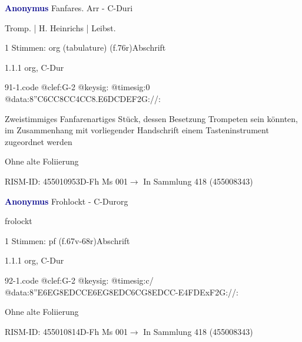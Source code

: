 \documentclass[twocolumn, 12pt]{book}
\begin{document}
\par \vspace{16pt} \textcolor{darkblue}{\textbf{Anonymus  }}\hfillplus{\textbf{[91]}}\newline Fanfares. Arr - C-Dur\newline i
\par \begin{itshape}[f.76r, at left:] Tromp. | H. Heinrichs | Leibst.\end{itshape} 
\par \textcolor{darkblue}{}  1 Stimmen: org (tabulature)  (f.76r)\newline Abschrift
\par 1.1.1  org, C-Dur  
\begin{filecontents*}{91-1.code}
@clef:G-2
@keysig:
@timesig:0
@data:{8''C6CC8CC}4CC{8.E6D}{CDEF}2G://:
\end{filecontents*}
\newline %
\par Zweistimmiges Fanfarenartiges Stück, dessen Besetzung Trompeten sein könnten, im Zusammenhang mit vorliegender Handschrift einem Tasteninstrument zugeordnet werden
\par Ohne alte Foliierung
\par RISM-ID: 455010953\newline D-Fh  Ms 001\newline $\rightarrow$ In Sammlung 418 (455008343)
      
\par \vspace{16pt} \textcolor{darkblue}{\textbf{Anonymus  }}\hfillplus{\textbf{[92]}}\newline Frohlockt - C-Dur\newline org
\par \begin{itshape}[f.67v, at left:] frolockt\end{itshape} 
\par \textcolor{darkblue}{}  1 Stimmen: pf  (f.67v-68r)\newline Abschrift
\par 1.1.1  org, C-Dur  
\begin{filecontents*}{92-1.code}
@clef:G-2
@keysig:
@timesig:c/
@data:{8''E6EG8ED}{CC}{E6EG8ED}{C6CG8ED}{CC}-E4FDExF2G://:
\end{filecontents*}
\newline %
\par Ohne alte Foliierung
\par RISM-ID: 455010814\newline D-Fh  Ms 001\newline $\rightarrow$ In Sammlung 418 (455008343)
      
\end{document}

